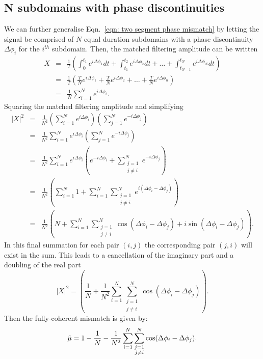 \documentclass[../full_thesis/full_thesis.tex]{subfiles}
\begin{document}
\subsection{N subdomains with phase discontinuities}
We can further generalise Eqn.~\eqref{eqn: two segment phase mismatch} by
letting the signal be comprised of $N$ equal duration subdomains with a phase discontinuity
$\Delta\phi_i$ for the $i^{th}$ subdomain.
Then, the matched filtering amplitude can be written
\begin{eqnarray}
X & = & \frac{1}{T}\left(\int_{0}^{t_{1}}e^{i\Delta\phi_{1}} dt +
\int_{t_{1}}^{t_{2}}e^{i\Delta\phi_{2}} dt + \dots +
\int_{t_{N-1}}^{t_{N}}e^{i\Delta\phi_{N}} dt \right) \\
& = &  \frac{1}{T}\left(\frac{T}{N}e^{i\Delta\phi_{1}} +
\frac{T}{N}e^{i\Delta\phi_{2}} + \dots + \frac{T}{N}e^{i\Delta\phi_{n}} \right)\\
& = & \frac{1}{N} \sum_{i=1}^{N}e^{i\Delta \phi_{i}}.
\end{eqnarray}
Squaring the matched filtering amplitude and simplifying
\begin{eqnarray}
|X|^{2} & = &  \frac{1}{N^{2}} \left(\sum_{i=1}^{N}e^{i\Delta \phi_{i}}\right)\left(\sum_{j=1}^{N}e^{-i\Delta \phi_{j}}\right) \\
& = &  \frac{1}{N^{2}} \sum_{i=1}^{N}e^{i\Delta \phi_{i}}\left(\sum_{j=1}^{N}e^{-i\Delta \phi_{j}}\right) \\
& = & \frac{1}{N^{2}} \sum_{i=1}^{N}e^{i\Delta \phi_{i}}\left(e^{-i\Delta \phi_{i}} +  \sum_{\substack{j=1 \\j\ne i}}^{N}e^{-i\Delta \phi_{j}}\right) \\
& = & \frac{1}{N^{2}} \left(\sum_{i=1}^{N}1 +   \sum_{i=1}^{N}\sum_{\substack{j=1 \\j\ne i}}^{N}e^{i(\Delta\phi_{i}-\Delta \phi_{j})}\right) \\
& = & \frac{1}{N^{2}} \left(N +   \sum_{i=1}^{N}\sum_{\substack{j=1 \\j\ne i}}^{N}\cos(\Delta\phi_{i} - \Delta\phi_{j}) + i\sin(\Delta\phi_{i} - \Delta\phi_{j})\right).
\end{eqnarray}
In this final summation for each pair $(i,j)$ the corresponding pair $(j, i)$
will exist in the sum. This leads to a cancellation of the imaginary part and a
doubling of the real part
\begin{equation}
|X|^{2}  = \left(\frac{1}{N} + \frac{1}{N^{2}}\sum_{i=1}^{N}\sum_{\substack{j=1 \\j\ne i}}^{N} \cos(\Delta\phi_{i} - \Delta \phi_{j})\right).
\end{equation}
Then the fully-coherent mismatch is given by:
\begin{equation}
\tilde{\mu} = 1 - \frac{1}{N} - \frac{1}{N^{2}}\sum_{i=1}^{N}\sum_{\substack{j=1 \\j\ne i}}^{N} \cos(\Delta\phi_{i} - \Delta\phi_{j}).
\label{eqn: phase mismatch}
\end{equation}
\end{document}
